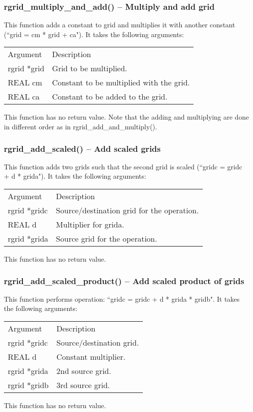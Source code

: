 \documentclass[12pt,letterpaper]{article}
\begin{document}
\subsubsection{rgrid\_multiply\_and\_add() -- Multiply and add grid}

This function adds a constant to grid and multiplies it with another constant (``grid = cm * grid + ca"). It takes the following arguments:
\begin{longtable}{p{} p{}}
Argument & Description\\
\cline{1-2}
rgrid *grid & Grid to be multiplied.\\
REAL cm & Constant to be multiplied with the grid.\\
REAL ca & Constant to be added to the grid.\\
\end{longtable}
\noindent
This function has no return value. Note that the adding and multiplying are done in different order as in rgrid\_add\_and\_multiply().

\subsubsection{rgrid\_add\_scaled() -- Add scaled grids}

This function adds two grids such that the second grid is scaled (``gridc = gridc + d * grida"). It takes the following arguments:
\begin{longtable}{p{} p{}}
Argument & Description\\
\cline{1-2}
rgrid *gridc & Source/destination grid for the operation.\\
REAL d & Multiplier for grida.\\
rgrid *grida & Source grid for the operation.\\
\end{longtable}
\noindent
This function has no return value.

\subsubsection{rgrid\_add\_scaled\_product() -- Add scaled product of grids}

This function performs operation: ``gridc = gridc + d * grida * gridb". It takes the following arguments:
\begin{longtable}{p{} p{}}
Argument & Description\\
\cline{1-2}
rgrid *gridc & Source/destination grid.\\
REAL d & Constant multiplier.\\
rgrid *grida & 2nd source grid.\\
rgrid *gridb & 3rd source grid.\\      
\end{longtable}
\noindent
This function has no return value.
\end{document}
